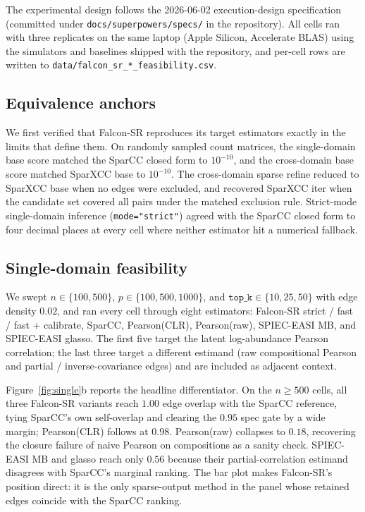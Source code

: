 \documentclass[unnumsec,webpdf,contemporary,large]{oup-authoring-template}
\newcommand{\codepath}[1]{\nolinkurl{#1}}
\theoremstyle{thmstyleone}
\theoremstyle{thmstyletwo}
\theoremstyle{thmstylethree}
\begin{document}
The experimental design follows the 2026-06-02 execution-design
specification (committed under \codepath{docs/superpowers/specs/} in
the repository). All cells ran with three replicates on the same
laptop (Apple Silicon, Accelerate BLAS) using the simulators and
baselines shipped with the repository, and per-cell rows are written
to \codepath{data/falcon_sr_*_feasibility.csv}.

\subsection{Equivalence anchors}\label{sec:results-anchors}

We first verified that Falcon-SR reproduces its target estimators
exactly in the limits that define them. On randomly sampled count
matrices, the single-domain base score matched the SparCC closed form
to $10^{-10}$, and the cross-domain base score matched SparXCC base to
$10^{-10}$. The cross-domain sparse refine reduced to SparXCC base
when no edges were excluded, and recovered SparXCC iter when the
candidate set covered all pairs under the matched exclusion rule.
Strict-mode single-domain inference (\texttt{mode="strict"}) agreed
with the SparCC closed form to four decimal places at every cell
where neither estimator hit a numerical fallback.

\subsection{Single-domain feasibility}\label{sec:results-single}

We swept $n \in \{100, 500\}$, $p \in \{100, 500, 1000\}$, and
$\texttt{top\_k} \in \{10, 25, 50\}$ with edge density $0.02$, and
ran every cell through eight estimators: Falcon-SR strict / fast /
fast + calibrate, SparCC, Pearson(CLR), Pearson(raw), SPIEC-EASI MB,
and SPIEC-EASI glasso. The first five target the latent
log-abundance Pearson correlation; the last three target a different
estimand (raw compositional Pearson and partial / inverse-covariance
edges) and are included as adjacent context.

Figure~\ref{fig:single}b reports the headline differentiator. On the
$n \geq 500$ cells, all three Falcon-SR variants reach $1.00$ edge
overlap with the SparCC reference, tying SparCC's own self-overlap
and clearing the $0.95$ spec gate by a wide margin; Pearson(CLR)
follows at $0.98$. Pearson(raw) collapses to $0.18$, recovering the
closure failure of naive Pearson on compositions as a sanity check.
SPIEC-EASI MB and glasso reach only $0.56$ because their
partial-correlation estimand disagrees with SparCC's marginal
ranking. The bar plot makes Falcon-SR's position direct: it is the
only sparse-output method in the panel whose retained edges
coincide with the SparCC ranking.
\end{document}
